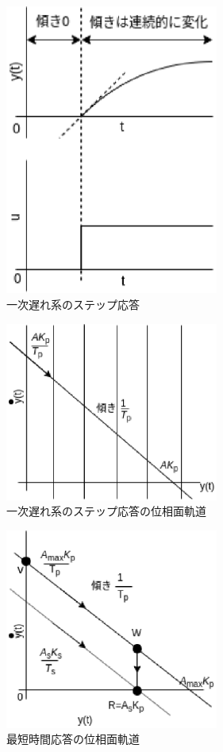 \documentclass[12pt]{jsarticle}
\begin{document}
\begin{figure}[tb]
  \begin{center}
    \includegraphics[clip,width=7.0cm]{../Img/FigC6.eps}
    \caption{一次遅れ系のステップ応答}
    \label{FigC6}
  \end{center}
\end{figure}
\begin{figure}[tb]
  \begin{center}
    \includegraphics[clip,width=7.0cm]{../Img/FigC7.eps}
    \caption{一次遅れ系のステップ応答の位相面軌道}
    \label{FigC7}
  \end{center}
\end{figure}
\begin{figure}[tb]
  \begin{center}
    \includegraphics[clip,width=7.0cm]{../Img/FigC8.eps}
    \caption{最短時間応答の位相面軌道}
    \label{FigC8}
  \end{center}
\end{figure}
\end{document}
